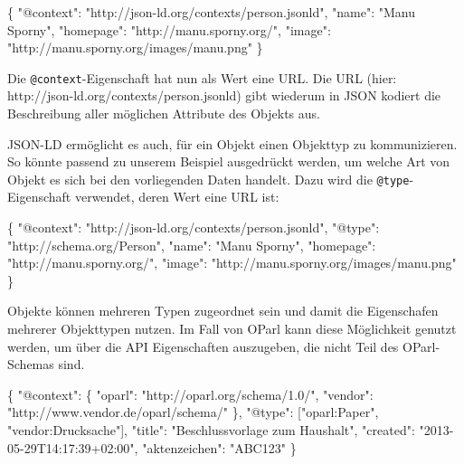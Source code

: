 \documentclass[,a4paper]{article}
\newenvironment{Shaded}{}{}
\newcommand{\DataTypeTok}[1]{\textcolor[rgb]{0.56,0.13,0.00}{{#1}}}
\newcommand{\StringTok}[1]{\textcolor[rgb]{0.25,0.44,0.63}{{#1}}}
\newcommand{\NormalTok}[1]{{#1}}
\begin{document}
\begin{Shaded}
\begin{Highlighting}[]
\NormalTok{\{}
  \DataTypeTok{"@context"}\NormalTok{: }\StringTok{"http://json-ld.org/contexts/person.jsonld"}\NormalTok{,}
  \DataTypeTok{"name"}\NormalTok{: }\StringTok{"Manu Sporny"}\NormalTok{,}
  \DataTypeTok{"homepage"}\NormalTok{: }\StringTok{"http://manu.sporny.org/"}\NormalTok{,}
  \DataTypeTok{"image"}\NormalTok{: }\StringTok{"http://manu.sporny.org/images/manu.png"}
\NormalTok{\}}
\end{Highlighting}
\end{Shaded}

Die \texttt{@context}-Eigenschaft hat nun als Wert eine URL. Die URL
(hier: http://json-ld.org/contexts/person.jsonld) gibt wiederum in JSON
kodiert die Beschreibung aller möglichen Attribute des Objekts aus.

JSON-LD ermöglicht es auch, für ein Objekt einen Objekttyp zu
kommunizieren. So könnte passend zu unserem Beispiel ausgedrückt werden,
um welche Art von Objekt es sich bei den vorliegenden Daten handelt.
Dazu wird die \texttt{@type}-Eigenschaft verwendet, deren Wert eine URL
ist:

\begin{Shaded}
\begin{Highlighting}[]
\NormalTok{\{}
  \DataTypeTok{"@context"}\NormalTok{: }\StringTok{"http://json-ld.org/contexts/person.jsonld"}\NormalTok{,}
  \DataTypeTok{"@type"}\NormalTok{: }\StringTok{"http://schema.org/Person"}\NormalTok{,}
  \DataTypeTok{"name"}\NormalTok{: }\StringTok{"Manu Sporny"}\NormalTok{,}
  \DataTypeTok{"homepage"}\NormalTok{: }\StringTok{"http://manu.sporny.org/"}\NormalTok{,}
  \DataTypeTok{"image"}\NormalTok{: }\StringTok{"http://manu.sporny.org/images/manu.png"}
\NormalTok{\}}
\end{Highlighting}
\end{Shaded}

Objekte können mehreren Typen zugeordnet sein und damit die Eigenschafen
mehrerer Objekttypen nutzen. Im Fall von OParl kann diese Möglichkeit
genutzt werden, um über die API Eigenschaften auszugeben, die nicht Teil
des OParl-Schemas sind.

\begin{Shaded}
\begin{Highlighting}[]
\NormalTok{\{}
  \DataTypeTok{"@context"}\NormalTok{: \{}
    \DataTypeTok{"oparl"}\NormalTok{: }\StringTok{"http://oparl.org/schema/1.0/"}\NormalTok{,}
    \DataTypeTok{"vendor"}\NormalTok{: }\StringTok{"http://www.vendor.de/oparl/schema/"}
  \NormalTok{\},}
  \DataTypeTok{"@type"}\NormalTok{: [}\StringTok{"oparl:Paper"}\NormalTok{, }\StringTok{"vendor:Drucksache"}\NormalTok{],}
  \DataTypeTok{"title"}\NormalTok{: }\StringTok{"Beschlussvorlage zum Haushalt"}\NormalTok{,}
  \DataTypeTok{"created"}\NormalTok{: }\StringTok{"2013-05-29T14:17:39+02:00"}\NormalTok{,}
  \DataTypeTok{"aktenzeichen"}\NormalTok{: }\StringTok{"ABC123"}
\NormalTok{\}}
\end{Highlighting}
\end{Shaded}
\end{document}
